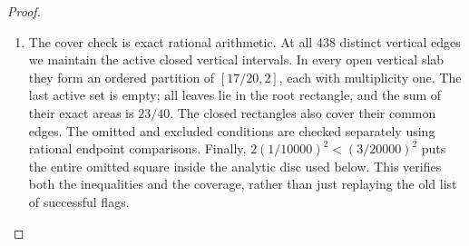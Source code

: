 \begin{proof}
\begin{enumerate}[label=\arabic*.,leftmargin=*]
\item The cover check is exact rational arithmetic. At all 438 distinct
vertical edges we maintain the active closed vertical intervals. In
every open vertical slab they form an ordered partition of
$[17/20,2]$, each with multiplicity one. The last active set is empty;
all leaves lie in the root rectangle, and the sum of their exact areas
is $23/40$. The closed rectangles also cover their common edges.
The omitted and excluded conditions are checked separately using
rational endpoint comparisons. Finally,
$2(1/10000)^2<(3/20000)^2$ puts the entire omitted square inside the
analytic disc used below. This verifies both the inequalities and
the coverage, rather than just replaying the old list of successful
flags.
\end{enumerate}
\end{proof}

